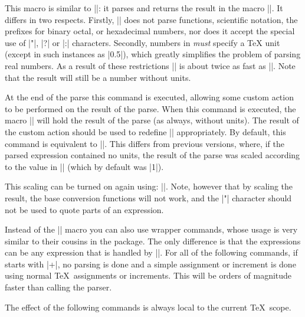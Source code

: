 \begin{command}{\pgfmathqparse{}}
    This macro is similar to |\pgfmathparse|: it parses  and
    returns the result in the macro |\pgfmathresult|. It differs in two
    respects. Firstly, |\pgfmathqparse| does not parse functions, scientific
    notation, the prefixes for binary octal, or hexadecimal numbers, nor does
    it accept the special use of |"|, |?| or |:| characters. Secondly, numbers
    in  \emph{must} specify a \TeX{} unit (except in such
    instances as |0.5\pgf@x|), which greatly simplifies the problem of parsing
    real numbers. As a result of these restrictions |\pgfmathqparse| is about
    twice as fast as |\pgfmathparse|. Note that the result will still be a
    number without units.
\end{command}

\begin{command}{\pgfmathpostparse}
    At the end of the parse this command is executed, allowing some custom
    action to be performed on the result of the parse. When this command is
    executed, the macro |\pgfmathresult| will hold the result of the parse (as
    always, without units). The result of the custom action should be used to
    redefine |\pgfmathresult| appropriately. By default, this command is
    equivalent to |\relax|. This differs from previous versions, where, if the
    parsed expression contained no units, the result of the parse was scaled
    according to the value in |\pgfmathresultunitscale| (which by default was
    |1|).

    This scaling can be  turned on again using:
    |\let\pgfmathpostparse=\pgfmathscaleresult|. Note, however that by scaling
    the result, the base conversion functions will not work, and the |"|
    character should not be used to quote parts of an expression.
\end{command}

Instead of the |\pgfmathparse| macro you can also use wrapper commands, whose
usage is very similar to their cousins in the \calcname{} package. The only
difference is that the expressions can be any expression that is handled by
|\pgfmathparse|. For all of the following commands, if  starts
with |+|, no parsing is done and a simple assignment or increment is done using
normal \TeX\ assignments or increments. This will be orders of magnitude faster
than calling the parser.

The effect of the following commands is always local to the current \TeX\
scope.

